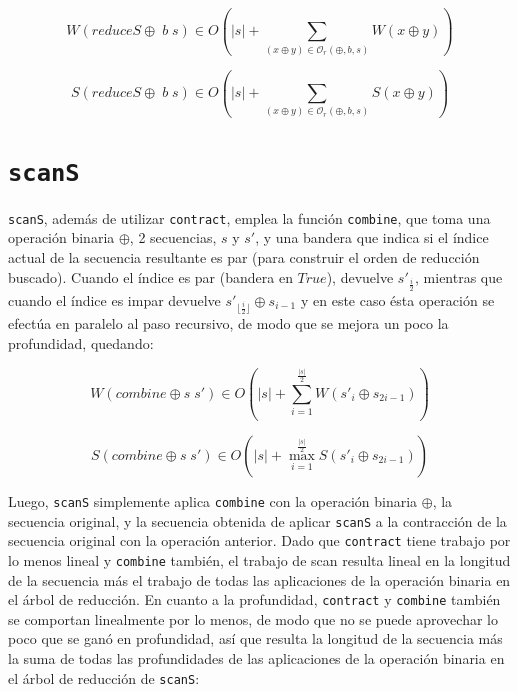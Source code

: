 \documentclass[a4paper,10pt]{article}
\begin{document}
\newpage

\begin{equation*}
    W \left( reduceS \oplus \; b \; s \right) \in
    O \left( \vert s \vert + \sum_{(x \oplus y) \in \mathcal{O}_r(\oplus,b,s)} W \left( x \oplus y \right) \right)
\end{equation*}

\begin{equation*}
    S \left( reduceS \oplus \; b \; s \right) \in
    O \left( \vert s \vert + \sum_{(x \oplus y) \in \mathcal{O}_r(\oplus,b,s)} S \left( x \oplus y \right) \right)
\end{equation*}

\section*{\texttt{scanS}}

\texttt{scanS}, además de utilizar \texttt{contract}, emplea la función \texttt{combine},
que toma una operación binaria $\oplus$, 2 secuencias, $s$ y $s'$, y una bandera
que indica si el índice actual de la secuencia resultante es par (para construir
el orden de reducción buscado). Cuando el índice es par (bandera en $True$),
devuelve $s'_{\frac{i}{2}}$, mientras que cuando el índice es impar devuelve
$s'_{\lfloor \frac{i}{2} \rfloor} \oplus s_{i-1}$ y en este caso ésta operación
se efectúa en paralelo al paso recursivo, de modo que se mejora un poco la
profundidad, quedando:

\begin{equation*}
    W \left( combine \oplus s \; s' \right) \in
    O \left( \vert s \vert + \sum_{i=1}^{\frac{\vert s \vert}{2}} W \left( s'_{i} \oplus s_{2i - 1} \right) \right)
\end{equation*}

\begin{equation*}
    S \left( combine \oplus s \; s' \right) \in
    O \left( \vert s \vert + \max_{i=1}^{\frac{\vert s \vert}{2}} S \left( s'_{i} \oplus s_{2i - 1} \right) \right)
\end{equation*}

Luego, \texttt{scanS} simplemente aplica \texttt{combine} con la operación binaria
$\oplus$, la secuencia original, y la secuencia obtenida de aplicar \texttt{scanS}
a la contracción de la secuencia original con la operación anterior. Dado que
\texttt{contract} tiene trabajo por lo menos lineal y \texttt{combine} también,
el trabajo de scan resulta lineal en la longitud de la secuencia más el trabajo
de todas las aplicaciones de la operación binaria en el árbol de reducción. En
cuanto a la profundidad, \texttt{contract} y \texttt{combine} también se comportan
linealmente por lo menos, de modo que no se puede aprovechar lo poco que se ganó
en profundidad, así que resulta la longitud de la secuencia más la suma de todas
las profundidades de las aplicaciones de la operación binaria en el árbol de
reducción de \texttt{scanS}:
\end{document}
